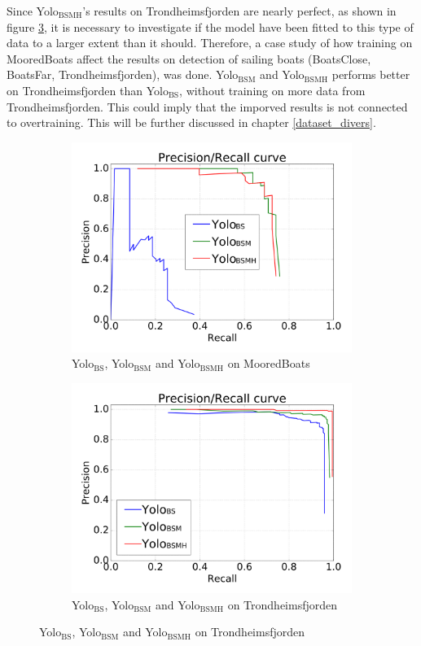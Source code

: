 Since Yolo$_{\text{BSMH}}$'s results on Trondheimsfjorden are nearly perfect, as shown in figure \ref{fig:moor_trf}, it is necessary to investigate if the model have been fitted to this type of data to a larger extent than it should. Therefore, a case study of how training on MooredBoats affect the results on detection of sailing boats (BoatsClose, BoatsFar, Trondheimsfjorden), was done. Yolo$_{\text{BSM}}$ and Yolo$_{\text{BSMH}}$ performs better on Trondheimsfjorden than Yolo$_{\text{BS}}$, without training on more data from Trondheimsfjorden. This could imply that the imporved results is not connected to overtraining. This will be further discussed in chapter \ref{dataset_divers}.


\begin{figure}[h!]
\captionsetup[subfigure]{justification=centering}
\begin{subfigure}{.5\textwidth}
  \centering
  \includegraphics[width=0.8\linewidth]{results/case_tr_moor/prec_recall/bb-eps2.png}
  \caption{Yolo$_{\text{BS}}$, Yolo$_{\text{BSM}}$ and Yolo$_{\text{BSMH}}$ on MooredBoats}
  \label{fig:moor_bb}
\end{subfigure}%
\begin{subfigure}{.5\textwidth}
  \centering
  \includegraphics[width=.8\linewidth]{results/case_tr_moor/prec_recall/trf-eps2.png}
  \caption{Yolo$_{\text{BS}}$, Yolo$_{\text{BSM}}$ and Yolo$_{\text{BSMH}}$  on Trondheimsfjorden}
  \label{fig:moor_trf}
\end{subfigure}


\end{figure}
